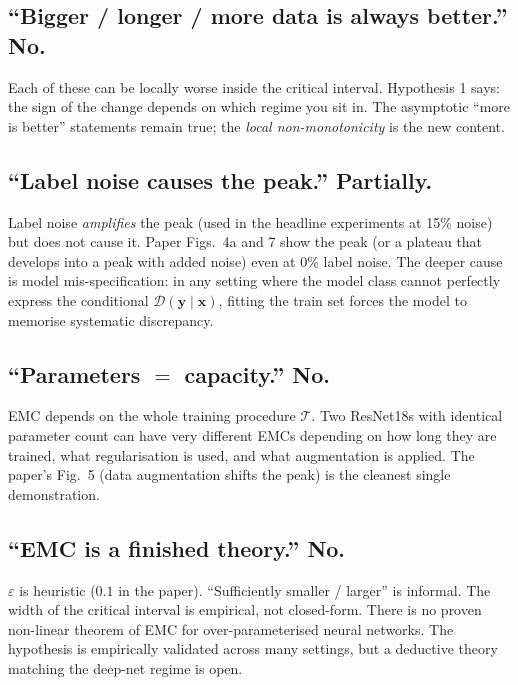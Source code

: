 \documentclass[11pt,a4paper]{article}
\newcommand{\T}{\mathcal{T}}
\newcommand{\D}{\mathcal{D}}
\theoremstyle{definition}
\begin{document}
\subsection{``Bigger / longer / more data is always better.'' \textbf{No.}}

Each of these can be locally worse inside the critical interval. Hypothesis 1 says: the sign of the change depends on which regime you sit in. The asymptotic ``more is better'' statements remain true; the \emph{local non-monotonicity} is the new content.

\subsection{``Label noise causes the peak.'' \textbf{Partially.}}

Label noise \emph{amplifies} the peak (used in the headline experiments at 15\% noise) but does not cause it. Paper Figs.\ 4a and 7 show the peak (or a plateau that develops into a peak with added noise) even at 0\% label noise. The deeper cause is model mis-specification: in any setting where the model class cannot perfectly express the conditional $\D(\bm{y}\mid\bm{x})$, fitting the train set forces the model to memorise systematic discrepancy.

\subsection{``Parameters $=$ capacity.'' \textbf{No.}}

EMC depends on the whole training procedure $\T$. Two ResNet18s with identical parameter count can have very different EMCs depending on how long they are trained, what regularisation is used, and what augmentation is applied. The paper's Fig.\ 5 (data augmentation shifts the peak) is the cleanest single demonstration.

\subsection{``EMC is a finished theory.'' \textbf{No.}}

$\varepsilon$ is heuristic ($0.1$ in the paper). ``Sufficiently smaller / larger'' is informal. The width of the critical interval is empirical, not closed-form. There is no proven non-linear theorem of EMC for over-parameterised neural networks. The hypothesis is empirically validated across many settings, but a deductive theory matching the deep-net regime is open.
\end{document}
